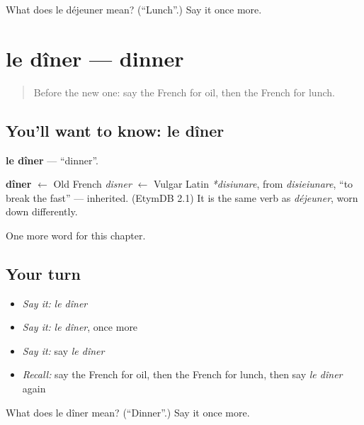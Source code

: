 \begin{tcolorbox}[breakable,colback=teal!4,colframe=teal!35!black,title={Before you move on}]
What does le déjeuner mean? (\textquotedblleft{}Lunch\textquotedblright{}.) Say it once more.
\end{tcolorbox}
\section[le dîner]{le dîner — dinner}

\label{lesson:FR-C70-diner}



\begin{quote}
Before the new one: say the French for oil, then the French for lunch.
\end{quote}

\subsection*{You'll want to know: le dîner}
\textbf{le dîner} — \textquotedblleft{}dinner\textquotedblright{}.

\begin{cousinweb}
\textbf{dîner} $\leftarrow$ Old French \emph{disner} $\leftarrow$ Vulgar Latin \emph{*disiunare}, from \emph{disieiunare}, \textquotedblleft{}to break the fast\textquotedblright{} — inherited. (EtymDB 2.1) It is the same verb as \emph{déjeuner}, worn down differently.
\end{cousinweb}

\begin{grammarlens}[title={What you've built}]
One more word for this chapter.
\end{grammarlens}

\subsection*{Your turn}
\begin{itemize}
\raggedright
  \item \emph{Say it:} \emph{le dîner}
  \item \emph{Say it:} \emph{le dîner}, once more
  \item \emph{Say it:} say \emph{le dîner}
  \item \emph{Recall:} say the French for oil, then the French for lunch, then say \emph{le dîner} again
\end{itemize}

\begin{tcolorbox}[breakable,colback=teal!4,colframe=teal!35!black,title={Before you move on}]
What does le dîner mean? (\textquotedblleft{}Dinner\textquotedblright{}.) Say it once more.
\end{tcolorbox}
